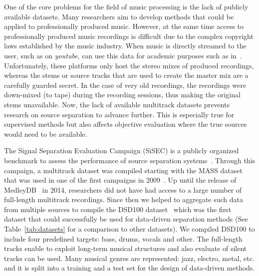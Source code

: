 One of the core problems for the field of music processing is the lack of publicly available datasets.
Many researchers aim to develop methods that could be applied to professionally produced music. 
However, at the same time access to professionally produced music recordings is difficult due to the complex copyright laws established by the music industry.
When music is directly streamed to the user, such as on \emph{youtube}, can use this data for academic purposes such as in~\cite{balke17}.
Unfortunately, these platforms only host the stereo mixes of produced recordings, whereas the stems or source tracks that are used to create the master mix are a carefully guarded secret.
In the case of very old recordings, the recordings were down-mixed (to tape) during the recording sessions, thus making the original stems unavailable.
Now, the lack of available multitrack datasets prevents research on source separation to advance further.
This is especially true for supervised methods but also affects objective evaluation where the true sources would need to be available.
\par
The Signal Separation Evaluation Campaign (SiSEC) is a publicly organized benchmark to assess the performance of source separation systems~\cite{sisec13, ono15, liutkus17, stoeter18sisec}. 
Through this campaign, a multitrack dataset was compiled starting with the MASS dataset~\cite{MTGMASSdb} that was used in one of the first campaigns in 2009~\cite{vincent09}.
Up until the release of MedleyDB~\cite{bittner14} in 2014, researchers did not have had access to a large number of full-length multitrack recordings.
Since then we helped to aggregate such data from multiple sources to compile the DSD100 dataset~\cite{liutkus17} which was the first dataset that could successfully be used for data-driven separation methods (See Table~\ref{tab:datasets} for a comparison to other datasets).
We compiled DSD100 to include four predefined targets: bass, drums, vocals and other.
The full-length tracks enable to exploit long-term musical structures and also evaluate of silent tracks can be used. 
Many musical genres are represented: jazz, electro, metal, etc. and it is split into a training and a test set for the design of data-driven methods.


